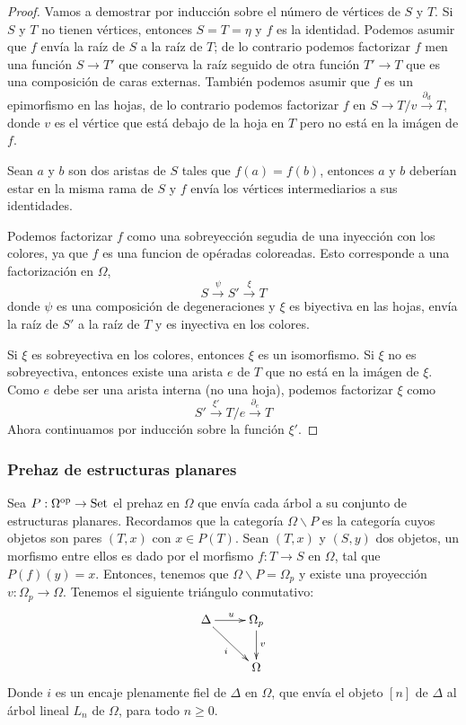 \documentclass[../main.tex]{subfiles}
\begin{document}
\begin{proof}
    Vamos a demostrar por inducci\'on sobre el n\'umero de v\'ertices de $S$ y $T$. Si $S$ y $T$ no tienen v\'ertices, entonces $S=T=\eta$ y $f$ es la identidad. Podemos asumir que $f$ env\'ia la ra\'iz de $S$ a la ra\'iz de $T$; de lo contrario podemos factorizar $f$ men una funci\'on $S\to T'$ que conserva la ra\'iz seguido de otra funci\'on $T'\to T$ que es una composici\'on de caras externas.
    Tambi\'en podemos asumir que $f$ es un epimorfismo en las hojas, de lo contrario podemos factorizar $f$ en $S\to T/v\overset{\partial_d}{\longrightarrow}T$, donde $v$ es el v\'ertice que est\'a debajo de la hoja en $T$ pero no est\'a en la im\'agen de $f$.

    Sean $a$ y $b$ son dos aristas de $S$ tales que $f(a)=f(b)$, entonces $a$ y $b$ deber\'ian estar en la misma rama de $S$ y $f$ env\'ia los v\'ertices intermediarios a sus identidades.

    Podemos factorizar $f$ como una sobreyecci\'on segudia de una inyecci\'on con los colores, ya que $f$ es una funcion de op\'eradas coloreadas. Esto corresponde a una factorizaci\'on en $\Omega$,
    $$
        S\overset{\psi }{\longrightarrow} S' \overset{\xi}{\longrightarrow} T
    $$
    donde $\psi$ es una composici\'on de degeneraciones y $\xi$ es biyectiva en las hojas, env\'ia la ra\'iz de $S'$ a la ra\'iz de $T$ y es inyectiva en los colores.

    Si $\xi$ es sobreyectiva en los colores, entonces $\xi$ es un isomorfismo. Si $\xi$ no es sobreyectiva, entonces existe una arista $e$ de $T$ que no est\'a en la im\'agen de $\xi$. Como $e$ debe ser una arista interna (no una hoja), podemos factorizar $\xi$ como
    $$
        S'\overset{\xi '}{\longrightarrow} T/e \overset{\partial_e}{\longrightarrow} T
    $$
    Ahora continuamos por inducci\'on sobre la funci\'on $\xi '$.
\end{proof}

\subsubsection{Prehaz de estructuras planares}
Sea $P:\Omega^{\rm op} \to \mathop{\rm Set}$ el prehaz en $\Omega$ que env\'ia cada \'arbol a su conjunto de estructuras planares.
Recordamos que la categor\'ia $\Omega\backslash P$ es la categor\'ia cuyos objetos son pares $(T,x)$ con $x\in P(T)$. Sean $(T,x)$ y $(S,y)$ dos objetos, un morfismo entre ellos es dado por el morfismo $f\colon T\to S$ en $\Omega$, tal que $P(f)(y) = x$.
Entonces, tenemos que $\Omega\backslash P = \Omega_p$ y existe una proyecci\'on $v\colon\Omega_p\to\Omega$. Tenemos el siguiente tri\'angulo conmutativo:
$$
    \xymatrix{
        \Delta \ar[rd]_{i} \ar[r]^u
        &\Omega_p \ar[d]^v\\
        &\Omega
    }
$$
Donde $i$ es un encaje plenamente fiel de $\Delta$ en $\Omega$, que env\'ia el objeto $[n]$ de $\Delta$ al \'arbol lineal $L_n$ de $\Omega$, para todo $n\ge 0$.
\end{document}

